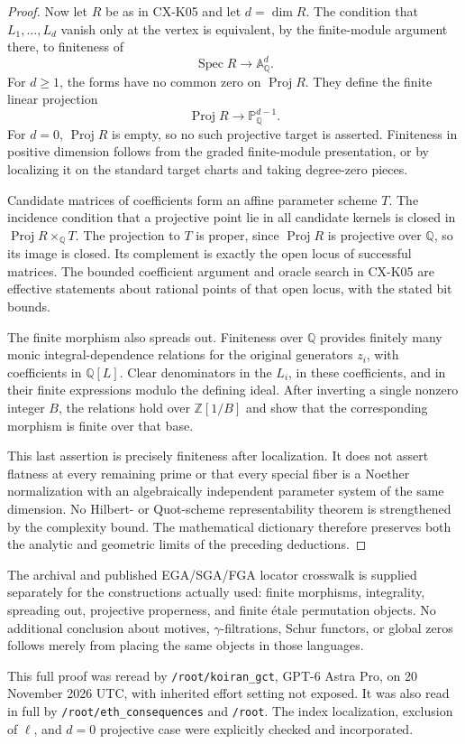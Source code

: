 \begin{proof}
Now let $R$ be as in CX-K05 and let $d=\dim R$. The condition that
$L_1,\ldots,L_d$ vanish only at the vertex is equivalent, by the
finite-module argument there, to finiteness of
\[
 \operatorname{Spec}R\longrightarrow\mathbb A_{\mathbb Q}^{d}.
\]
For $d\ge1$, the forms have no common zero on $\operatorname{Proj}R$.
They define the finite linear projection
\[
 \operatorname{Proj}R\longrightarrow\mathbb P_{\mathbb Q}^{d-1}.
\]
For $d=0$, $\operatorname{Proj}R$ is empty, so no such projective
target is asserted. Finiteness in positive dimension follows from the
graded finite-module presentation, or by localizing it on the
standard target charts and taking degree-zero pieces.

Candidate matrices of coefficients form an affine parameter scheme
$T$. The incidence condition that a projective point lie in all
candidate kernels is closed in
$\operatorname{Proj}R\times_{\mathbb Q}T$.
The projection to $T$ is proper, since $\operatorname{Proj}R$ is
projective over $\mathbb Q$, so its image is closed. Its complement
is exactly the open locus of successful matrices. The bounded
coefficient argument and oracle search in CX-K05 are effective
statements about rational points of that open locus, with the stated
bit bounds.

The finite morphism also spreads out. Finiteness over $\mathbb Q$
provides finitely many monic integral-dependence relations for the
original generators $z_i$, with coefficients in $\mathbb Q[L]$.
Clear denominators in the $L_i$, in these coefficients, and in their
finite expressions modulo the defining ideal. After inverting a
single nonzero integer $B$, the relations hold over
$\mathbb Z[1/B]$ and show that the corresponding morphism is finite
over that base.

This last assertion is precisely finiteness after localization. It
does not assert flatness at every remaining prime or that every
special fiber is a Noether normalization with an algebraically
independent parameter system of the same dimension. No
Hilbert- or Quot-scheme representability theorem is strengthened by
the complexity bound. The mathematical dictionary therefore preserves
both the analytic and geometric limits of the preceding deductions.
\end{proof}

The archival and published EGA/SGA/FGA locator crosswalk is supplied
separately for the constructions actually used: finite morphisms,
integrality, spreading out, projective properness, and finite \'etale
permutation objects. No additional conclusion about motives,
$\gamma$-filtrations, Schur functors, or global zeros follows merely
from placing the same objects in those languages.

This full proof was reread by \texttt{/root/koiran\_gct}, GPT-6 Astra
Pro, on 20 November 2026 UTC, with inherited effort setting not
exposed. It was also read in full by \texttt{/root/eth\_consequences}
and \texttt{/root}. The index localization, exclusion of $\ell$,
and $d=0$ projective case were explicitly checked and incorporated.
